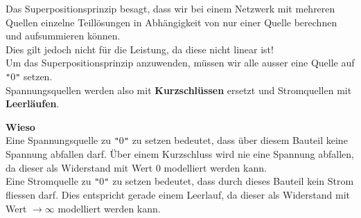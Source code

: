 										 Das Superpositionsprinzip besagt, dass wir bei einem Netzwerk mit mehreren Quellen einzelne Teillösungen in Abhängigkeit von nur einer Quelle berechnen und aufsummieren können. \\
										 Dies gilt jedoch nicht für die Leistung, da diese nicht linear ist! \\
										 Um das Superpositionsprinzip anzuwenden, müssen wir alle ausser eine Quelle auf \texttt{"}0\texttt{"} setzen. \\
										 Spannungsquellen werden also mit \textbf{Kurzschlüssen} ersetzt und Stromquellen mit \textbf{Leerläufen}. \\
										 \begin{center}
										 	\fix
										 \end{center}


										 \textbf{Wieso} \\
										 Eine Spannungsquelle zu \texttt{"}0\texttt{"} zu setzen bedeutet, dass über diesem Bauteil keine Spannung abfallen darf. Über einem Kurzschluss wird nie eine Spannung abfallen, da dieser als Widerstand mit Wert 0 modelliert werden kann. \\
										 Eine Stromquelle zu \texttt{"}0\texttt{"} zu setzen bedeutet, dass durch dieses Bauteil kein Strom fliessen darf. Dies entspricht gerade einem Leerlauf, da dieser als Widerstand mit Wert $\displaystyle \rightarrow \infty$ modelliert werden kann. \\



